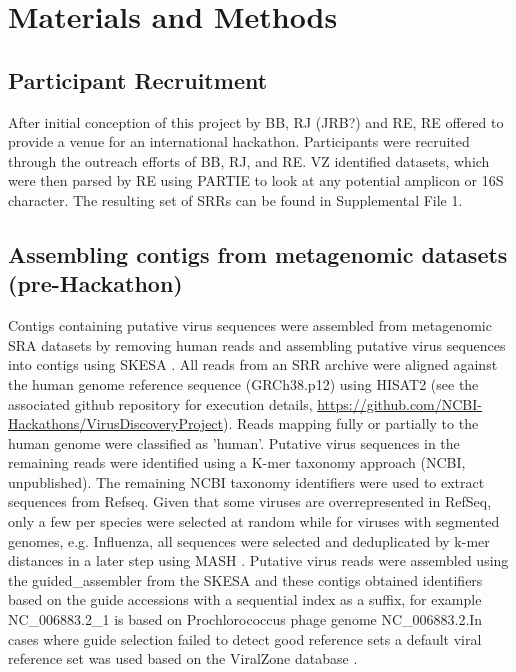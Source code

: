 \section{Materials and Methods}

  \subsection{Participant Recruitment}
  After initial conception of this project by BB, RJ (JRB?) and RE, RE offered
  to provide a venue for an international hackathon.  Participants were
  recruited through the outreach efforts of BB, RJ, and RE.  VZ identified
  datasets, which were then parsed by RE using PARTIE \cite{Torres2017} to look
  at any potential amplicon or 16S character.  The resulting set of SRRs can be
  found in Supplemental File 1.

  \subsection{Assembling contigs from metagenomic datasets (pre-Hackathon)}
  Contigs containing putative virus sequences were assembled from metagenomic
  SRA datasets by removing human reads and assembling putative virus sequences
  into contigs using SKESA \cite{Souvorov2018}. All reads from an SRR archive
  were aligned against the human genome reference sequence (GRCh38.p12) using
  HISAT2 \cite{Kim2015} (see the associated github repository for execution
  details, \url{https://github.com/NCBI-Hackathons/VirusDiscoveryProject}).
  Reads mapping fully or partially  to the human genome were  classified as
  'human'. Putative virus sequences in the remaining reads were identified
  using a K-mer taxonomy approach (NCBI, unpublished). The remaining NCBI
  taxonomy identifiers were used to extract sequences from Refseq. Given that
  some viruses are overrepresented in RefSeq,  only a few per species were
  selected at random while for viruses with segmented genomes, e.g. Influenza,
  all sequences were selected and deduplicated by k-mer distances in a later
  step using MASH \cite{Ondov2019}. Putative virus reads were assembled using
  the guided\_assembler from the SKESA and these contigs obtained identifiers
  based on the guide accessions with a sequential index as a suffix, for
  example NC\_006883.2\_1 is based on Prochlorococcus phage genome
  NC\_006883.2.In cases where guide selection failed to detect good reference
  sets a default viral reference set was used based on the ViralZone database
  \cite{Hulo2011}.


